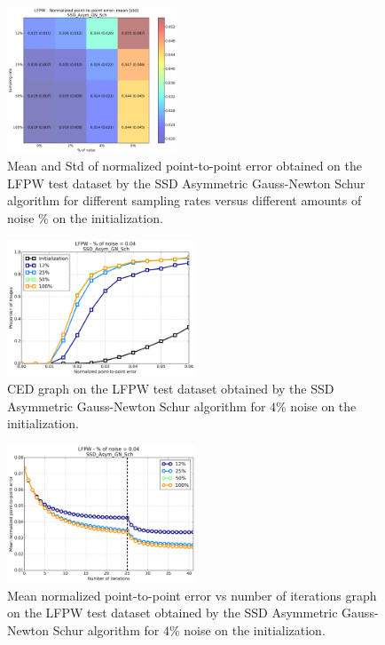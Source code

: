 \begin{figure}[h!]
    \centering
    \includegraphics[width=0.45\textwidth]{experiments/sampling/ssd_asymmetric_gn/noise_vs_sampling_ssd_asymmetric.png}
    \caption{Mean and Std of normalized point-to-point error obtained on the LFPW test dataset by the SSD Asymmetric Gauss-Newton Schur algorithm for different sampling rates versus different amounts of noise \% on the initialization.}
    \label{fig:noise_vs_sampling_ssd_asymmetric}
\end{figure}

\begin{figure}[h!]
    \centering
    \includegraphics[width=0.50\textwidth]{experiments/sampling/ssd_asymmetric_gn/ced_ssd_asymmetric_gn_4.png}
    \caption{CED graph on the LFPW test dataset obtained by the SSD Asymmetric Gauss-Newton Schur algorithm for $4$\% noise on the initialization.}
    \label{fig:ced_ssd_asymmetric_gn_4}
\end{figure}

\begin{figure}[h!]
    \centering
    \includegraphics[width=0.50\textwidth]{experiments/sampling/ssd_asymmetric_gn/mean_error_vs_iters_ssd_asymmetric_gn_4.png}
    \caption{Mean normalized point-to-point error vs number of iterations graph on the LFPW test dataset obtained by the SSD Asymmetric Gauss-Newton Schur algorithm for $4$\% noise on the initialization.}
    \label{fig:mean_error_vs_iters_ssd_asymmetric_gn_4}
\end{figure}

